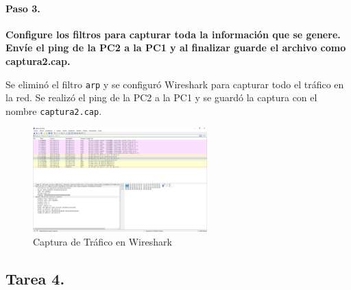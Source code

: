     \paragraph{Paso 3.}
        \textbf{Configure los filtros para capturar toda la información que se genere. Envíe el ping de la PC2 a la PC1 y al finalizar guarde el archivo como captura2.cap.}

        Se eliminó el filtro \texttt{arp} y se configuró Wireshark para capturar todo el tráfico en la red. Se realizó el ping de la PC2 a la PC1 y se guardó la captura con el nombre \texttt{captura2.cap}.

        \begin{figure}[H]
            \centering
            \includegraphics[width=0.6\textwidth]{img/wireshark_datos.PNG}
            \caption{Captura de Tráfico en Wireshark}
            \label{fig:wireshark_datos}
        \end{figure}
    \subsection{Tarea 4.}
